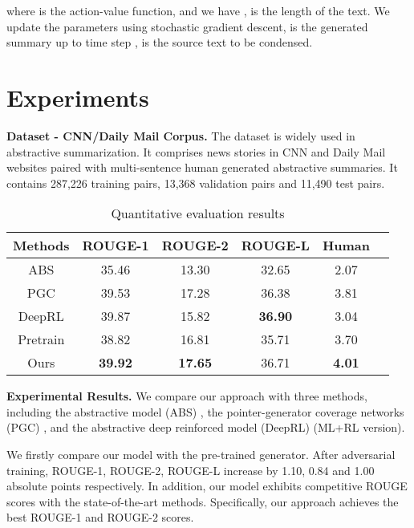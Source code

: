 \documentclass[letterpaper]{article} \usepackage{aaai18}  \usepackage{times}  \usepackage{helvet}  \usepackage{courier}  \usepackage{url}  \usepackage{graphicx}  \frenchspacing  \usepackage{multirow}
\begin{document}
{\scriptsize
	
}
where  is the action-value function, and we have ,  is the length of the text. We update the parameters using stochastic gradient descent,  is the generated summary up to time step ,   is the source text to be condensed. 

\section{Experiments}

\textbf{Dataset - CNN/Daily Mail Corpus.} The dataset \cite{nallapati2016abstractive} is widely used in abstractive summarization. It comprises news stories in CNN and Daily Mail websites paired with multi-sentence human generated abstractive summaries. It contains 287,226 training pairs, 13,368 validation pairs and 11,490 test pairs. 


\begin{table}[]
	\footnotesize
	\centering
	\begin{tabular}{|c|c|c|c|c|c|}
		\hline
		Methods & ROUGE-1 & ROUGE-2 & ROUGE-L & Human\\ \hline
		ABS &   35.46   & 13.30 & 32.65  & 2.07\\ \hline
		PGC &   39.53   & 17.28 &  36.38 & 3.81\\ \hline
		DeepRL  &   39.87   & 15.82 &  \textbf{36.90}&3.04\\ \hline
		Pretrain & 38.82 & 16.81 & 35.71 & 3.70 \\ \hline
		Ours   &   \textbf{39.92} & \textbf{17.65} & 36.71 & \textbf{4.01} \\ \hline
	\end{tabular}
	\caption{Quantitative evaluation results}
	\label{my-label}
\end{table}


\textbf{Experimental Results.} We compare our approach with three methods, including the abstractive model (ABS) \cite{nallapati2016abstractive}, the pointer-generator coverage networks (PGC) \cite{see2017get}, and the abstractive deep reinforced model (DeepRL) \cite{paulus2017deep} (ML+RL version).

We firstly compare our model with the pre-trained generator. After adversarial training, ROUGE-1, ROUGE-2, ROUGE-L increase by 1.10, 0.84 and 1.00 absolute points respectively. In addition, our model exhibits competitive ROUGE scores with the state-of-the-art methods. Specifically, our approach achieves the best ROUGE-1 and ROUGE-2 scores. 
\end{document}
